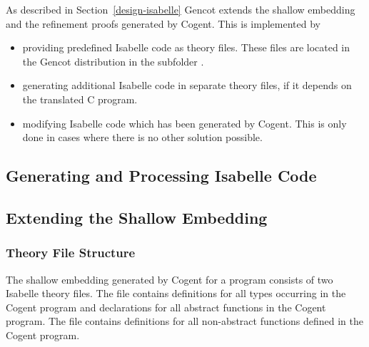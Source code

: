 As described in Section~\ref{design-isabelle} Gencot extends the shallow embedding and 
the refinement proofs generated by Cogent. This is implemented by
\begin{itemize}
\item providing predefined Isabelle code as theory files. These files are located 
in the Gencot distribution in the subfolder .
\item generating additional Isabelle code in separate theory files, if it depends 
on the translated C program.
\item modifying Isabelle code which has been generated by Cogent. This is only done
in cases where there is no other solution possible.
\end{itemize}

\subsection{Generating and Processing Isabelle Code}
\label{impl-isabelle-code}

\subsection{Extending the Shallow Embedding}
\label{impl-isabelle-shallow}

\subsubsection{Theory File Structure}

The shallow embedding generated by Cogent for a program  consists of two Isabelle theory files. The file 
 contains definitions for all types occurring in the Cogent program and declarations
for all abstract functions in the Cogent program. The file  contains definitions 
for all non-abstract functions defined in the Cogent program.

